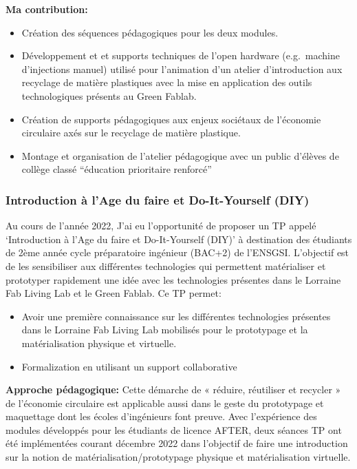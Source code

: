 \documentclass[
  11pt,
]{article}
\providecommand{\tightlist}{%
  \setlength{\itemsep}{0pt}\setlength{\parskip}{0pt}}\usepackage{longtable,booktabs,array}
\begin{document}
\textbf{Ma contribution:}

\begin{itemize}
\tightlist
\item
  Création des séquences pédagogiques pour les deux modules.
\item
  Développement et et supports techniques de l'open hardware
  (e.g.~machine d'injections manuel) utilisé pour l'animation d'un
  atelier d'introduction aux recyclage de matière plastiques avec la
  mise en application des outils technologiques présents au Green
  Fablab.
\item
  Création de supports pédagogiques aux enjeux sociétaux de l'économie
  circulaire axés sur le recyclage de matière plastique.
\item
  Montage et organisation de l'atelier pédagogique avec un public
  d'élèves de collège classé ``éducation prioritaire renforcé''
\end{itemize}

\hypertarget{introduction-uxe0-lage-du-faire-et-do-it-yourself-diy}{%
\subsubsection{Introduction à l'Age du faire et Do-It-Yourself
(DIY)}\label{introduction-uxe0-lage-du-faire-et-do-it-yourself-diy}}

Au cours de l'année 2022, J'ai eu l'opportunité de proposer un TP appelé
`Introduction à l'Age du faire et Do-It-Yourself (DIY)' à destination
des étudiants de 2ème année cycle préparatoire ingénieur (BAC+2) de
l'ENSGSI. L'objectif est de les sensibiliser aux différentes
technologies qui permettent matérialiser et prototyper rapidement une
idée avec les technologies présentes dans le Lorraine Fab Living Lab et
le Green Fablab. Ce TP permet:

\begin{itemize}
\tightlist
\item
  Avoir une première connaissance sur les différentes technologies
  présentes dans le Lorraine Fab Living Lab mobilisés pour le
  prototypage et la matérialisation physique et virtuelle.
\item
  Formalization en utilisant un support collaborative
\end{itemize}

\textbf{Approche pédagogique: } Cette démarche de « réduire, réutiliser
et recycler » de l'économie circulaire est applicable aussi dans le
geste du prototypage et maquettage dont les écoles d'ingénieurs font
preuve. Avec l'expérience des modules développés pour les étudiants de
licence AFTER, deux séances TP ont été implémentées courant décembre
2022 dans l'objectif de faire une introduction sur la notion de
matérialisation/prototypage physique et matérialisation virtuelle.
\end{document}
